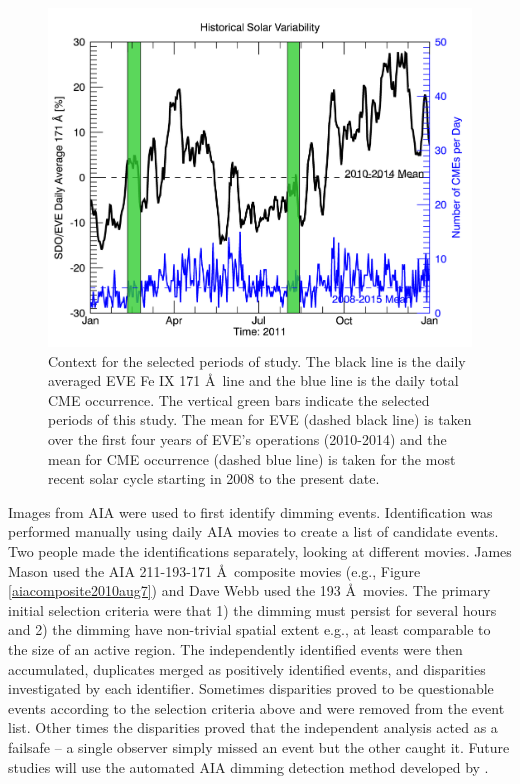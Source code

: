\begin{figure}[!h]
    \begin{center}
	    \includegraphics[width=150mm]{Images/FourWeekContext.png}
    \end{center}
    \caption[Selected four week period in historical context]{
        Context for the selected periods of study. The black line is the daily averaged EVE Fe IX 171 \AA\ line and the 
        blue line is the daily total CME occurrence. The vertical green bars indicate the selected periods of this study.
        The mean for EVE (dashed black line) is taken over the first four years of EVE's operations (2010-2014) and the 
        mean for CME occurrence (dashed blue line) is taken for the most recent solar cycle starting in 2008 to the present 
        date.
	}
    \label{fig:historicalcontext}
\end{figure} 
 
Images from AIA were used to first identify dimming events. Identification was performed manually using daily AIA movies to create a list of candidate events. Two people made the identifications separately, looking at different movies. James Mason used the AIA 211-193-171 \AA\ composite movies (e.g., Figure \ref{aiacomposite2010aug7}) and Dave Webb used the 193 \AA\ movies. The primary initial selection criteria were that 1) the dimming must persist for several hours and 2) the dimming have non-trivial spatial extent e.g., at least comparable to the size of an active region. The independently identified events were then accumulated, duplicates merged as positively identified events, and disparities investigated by each identifier. Sometimes disparities proved to be questionable events according to the selection criteria above and were removed from the event list. Other times the disparities proved that the independent analysis acted as a failsafe -- a single observer simply missed an event but the other caught it. Future studies will use the automated AIA dimming detection method developed by \citet{Krista2013a}. 
 
